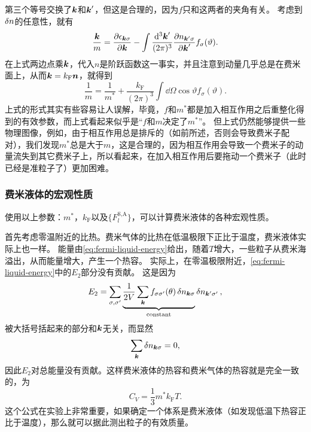 \documentclass[hyperref, UTF8, a4paper]{ctexart}
\begin{document}
第三个等号交换了$\vb*{k}$和$\vb*{k}'$，但这是合理的，因为$f$只和这两者的夹角有关。
考虑到$\var{n}$的任意性，就有
\[
    \frac{\vb*{k}}{m} = \pdv{\epsilon_{\vb*{k} \sigma}}{\vb*{k}} - \int \frac{\dd[3]{\vb*{k}'}}{(2\pi)^3} \pdv{n_{\vb*{k}' \sigma}}{\vb*{k}'} f_{\sigma}(\vartheta).
\]
在上式两边点乘$\vb*{k}$，代入$n$是阶跃函数这一事实，并且注意到动量几乎总是在费米面上，从而$\vb*{k} = k_\text{F} \vb*{n}$，就得到
\begin{equation}
    \frac{1}{m} = \frac{1}{m^*} + \frac{k_\text{F}}{(2\pi)^3} \int \dd{\Omega} \cos \vartheta f_\sigma(\vartheta).
\end{equation}
上式的形式其实有些容易让人误解，毕竟，$f$和$m^*$都是加入相互作用之后重整化得到的有效参数，而上式看起来似乎是“$f$和$m$决定了$m^*$”。
但上式仍然能够提供一些物理图像，例如，由于相互作用总是排斥的（如前所述，否则会导致费米子配对），我们发现$m^*$总是大于$m$，这是合理的，因为相互作用会导致一个费米子的动量流失到其它费米子上，所以看起来，在加入相互作用后要拖动一个费米子（此时已经是准粒子了）更加困难。

\subsubsection{费米液体的宏观性质}

使用以上参数：$m^*$，$k_\text{F}$以及$\{F_l^\text{S,A}\}$，可以计算费米液体的各种宏观性质。

首先考虑零温附近的比热。费米气体的比热在低温极限下正比于温度，费米液体实际上也一样。
能量由\eqref{eq:fermi-liquid-energy}给出，随着$T$增大，一些粒子从费米海溢出，从而能量增大，产生一个热容。
实际上，在零温极限附近，\eqref{eq:fermi-liquid-energy}中的$E_2$部分没有贡献。
这是因为
\[
    E_2 = \sum_{\sigma, \sigma'} \underbrace{\frac{1}{2V} \sum_{\vb*{k}} f_{\sigma \sigma'}(\theta) \var{n}_{\vb*{k} \sigma}}_{\text{constant}} \var{n}_{\vb*{k}' \sigma'},
\]
被大括号括起来的部分和$\vb*{k}$无关，而显然
\[
    \sum_{\vb*{k}} \var{n}_{\vb*{k} \sigma} = 0,
\]
因此$E_2$对总能量没有贡献。这样费米液体的热容和费米气体的热容就是完全一致的，为
\begin{equation}
    C_V = \frac{1}{3} m^* k_\text{F} T.
\end{equation}
这个公式在实验上非常重要，如果确定一个体系是费米液体（如发现低温下热容正比于温度），那么就可以据此测出粒子的有效质量。
\end{document}
